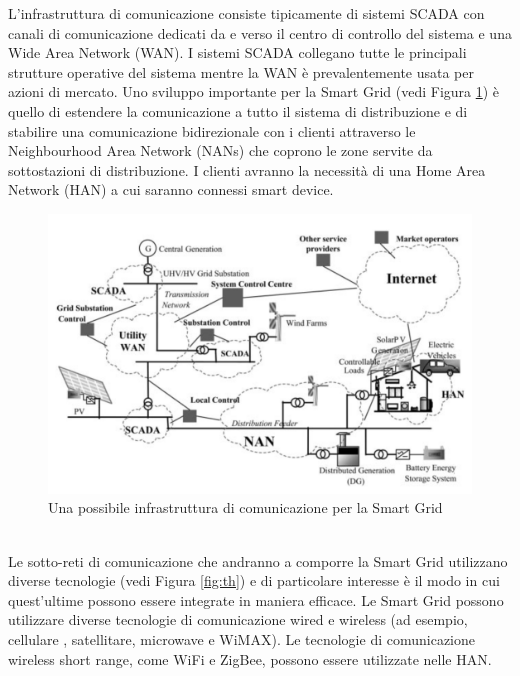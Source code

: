 L'infrastruttura di comunicazione consiste tipicamente di sistemi SCADA con canali di comunicazione dedicati da e verso il centro di controllo del sistema e una Wide Area Network (WAN). I sistemi SCADA collegano tutte le principali strutture operative del sistema mentre la WAN è prevalentemente usata per azioni di mercato. Uno sviluppo importante per la Smart Grid (vedi Figura \ref{fig:cisg}) è quello di estendere la comunicazione a tutto il sistema di distribuzione e di stabilire una comunicazione bidirezionale con i clienti attraverso le Neighbourhood Area Network (NANs) che coprono le zone servite da sottostazioni di distribuzione. I clienti avranno la necessità di una Home Area Network (HAN) a cui saranno connessi smart device.
\begin{figure}[h]
	\centering
	\includegraphics[scale=0.300]{imgs/comm_inf_SG.png}
	\caption{Una possibile infrastruttura di comunicazione per la Smart Grid} \label{fig:cisg}
\end{figure}\\
Le sotto-reti di comunicazione che andranno a comporre la Smart Grid utilizzano diverse tecnologie (vedi Figura \ref{fig:th}) e di particolare interesse è il modo in cui quest'ultime possono essere integrate in maniera efficace. Le Smart Grid possono utilizzare diverse tecnologie di comunicazione wired e wireless (ad esempio, cellulare , satellitare, microwave e WiMAX). Le tecnologie di comunicazione wireless short range, come WiFi e ZigBee,  possono essere utilizzate nelle HAN.
